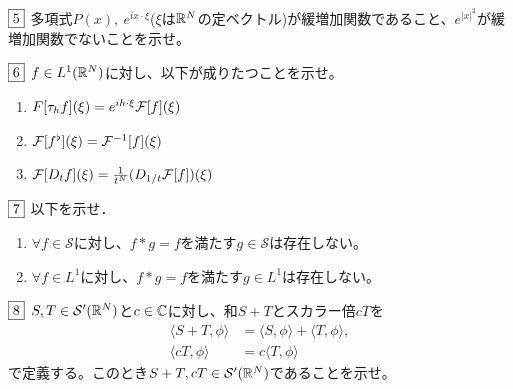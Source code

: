\documentclass[dvipdfmx, leqno]{jsreport}
\begin{document}
\begin{tcolorbox}$\fbox{5}$
    多項式$P(x),\ e^{ix\cdot \xi}$($\xi$は$\mathbb{R}^N$の定ベクトル)が緩増加関数であること、$e^{|x|^2}$が緩増加関数でないことを示せ。
\end{tcolorbox}
\begin{tcolorbox}$\fbox{6}$
    $f\in L^1(\mathbb{R}^N)$に対し、以下が成りたつことを示せ。
\begin{enumerate}
    \item $F[\tau_h f](\xi)= e^{ih\cdot \xi} \mathcal{F}[f](\xi)$
    \item $\mathcal{F}[f^\flat](\xi)= \mathcal{F}^{-1}[f](\xi)$
    \item $\mathcal{F}[D_t f](\xi)= \frac{1}{t^N}(D_{1/t}\mathcal{F}[f])(\xi)$
\end{enumerate}
\end{tcolorbox}
\begin{tcolorbox}$\fbox{7}$
    以下を示せ．
\begin{enumerate}
    \item $\forall f\in \mathcal{S}$に対し、$f\ast g= f$を満たす$g\in \mathcal{S}$は存在しない。
    \item $\forall f\in L^1$に対し、$f\ast g= f$を満たす$g\in L^1$は存在しない。

\end{enumerate}
\end{tcolorbox}
\begin{tcolorbox}$\fbox{8}$
    $S, T\in \mathcal{S}'(\mathbb{R}^N)$と$c\in \mathbb{C}$に対し、和$S+ T$とスカラー倍$cT$を
\begin{align}
    \langle{S+ T, \phi}\rangle&= \langle{S, \phi}\rangle+ \langle{T, \phi}\rangle,\\
    \langle{cT, \phi}\rangle&= c\langle{T, \phi}\rangle
\end{align}
    で定義する。このとき$S+ T, cT\in \mathcal{S}'(\mathbb{R}^N)$であることを示せ。
\end{tcolorbox}
\end{document}
